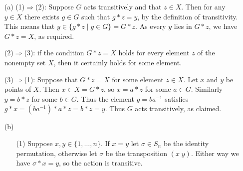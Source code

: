 \documentclass{amsart}
\newcommand{\xra}{\xrightarrow}
\renewcommand{\:}{\colon}
\newcommand{\st}{\;|\;}
\newcommand{\R}{\mathbb{R}}
\newcommand{\sg}        {\sigma}
\theoremstyle{definition}
\newenvironment{solution}{{\noindent\bf Solution:}}{}
\begin{document}
\begin{solution}
\begin{itemize}
 \item[(a)] (1)$\Rightarrow$(2): Suppose $G$ acts transitively and
  that $z\in X$.  Then for any $y\in X$ there exists $g\in G$ such
  that $g*z=y$, by the definition of transitivity.  This means that
  $y\in\{g*z\st g\in G\}=G*z$.  As every $y$ lies in $G*z$, we have
  $G*z=X$, as required.

  (2)$\Rightarrow$(3): if the condition $G*z=X$ holds for every
  element $z$ of the nonempty set $X$, then it certainly holds for
  some element.

  (3)$\Rightarrow$(1): Suppose that $G*z=X$ for some element
  $z\in X$.  Let $x$ and $y$ be points of $X$.  Then $x\in X=G*z$, so
  $x=a*z$ for some $a\in G$.  Similarly $y=b*z$ for some $b\in G$.
  Thus the element $g=ba^{-1}$ satisfies $g*x=(ba^{-1})*a*z=b*z=y$.
  Thus $G$ acts transitively, as claimed.
 \item[(b)] 
  \begin{itemize}
  \item[(1)] Suppose $x,y\in\{1,\ldots,n\}$.  If $x=y$ let
   $\sg\in S_n$ be the identity permutation, otherwise let $\sg$ be
   the transposition $(x\; y)$.  Either way we have $\sg*x=y$, so the
   action is transitive.

\end{itemize}
\end{itemize}
\end{solution}
\end{document}
